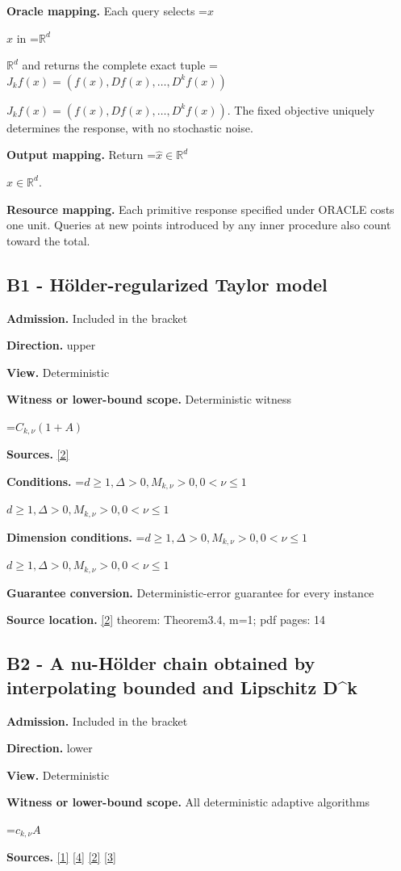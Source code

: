 \documentclass[10pt,a4paper]{article}
\newcommand{\AtlasMath}[1]{\par\begingroup\centering\setbox0=\hbox{$\displaystyle #1$}\ifdim\wd0>1.4\linewidth\typeout{ATLAS WIDE FORMULA: \the\wd0}\fi\ifdim\wd0>\linewidth\resizebox{\linewidth}{!}{\box0}\else\box0\fi\par\endgroup}
\newcommand{\AtlasInlineMath}[1]{\begingroup\setbox0=\hbox{$#1$}\ifdim\wd0>.4\linewidth\endgroup\AtlasMath{#1}\else\endgroup$#1$\fi}
\begin{document}
\textbf{Oracle mapping.} Each query selects \AtlasInlineMath{x} in \AtlasInlineMath{\mathbb{R}^d} and returns the complete exact tuple \AtlasInlineMath{J_{k}f(x)=(f(x),Df(x),\ldots,D^{k}f(x))}. The fixed objective uniquely determines the response, with no stochastic noise.

\textbf{Output mapping.} Return \AtlasInlineMath{\widehat{x}\in \mathbb{R}^d}.

\textbf{Resource mapping.} Each primitive response specified under ORACLE costs one unit. Queries at new points introduced by any inner procedure also count toward the total.

\subsection{B1 - Hölder-regularized Taylor model}
\textbf{Admission.} Included in the bracket

\textbf{Direction.} upper

\textbf{View.} Deterministic

\textbf{Witness or lower-bound scope.} Deterministic witness

\AtlasMath{C_{k,\nu}(1+A)}
\textbf{Sources.} \href{https://arxiv.org/abs/1811.01220}{[2]}

\textbf{Conditions.} \AtlasInlineMath{d\ge 1,\Delta>0,M_{k,\nu}>0,0<\nu\le 1}

\textbf{Dimension conditions.} \AtlasInlineMath{d\ge 1,\Delta>0,M_{k,\nu}>0,0<\nu\le 1}

\textbf{Guarantee conversion.} Deterministic-error guarantee for every instance

\textbf{Source location.} \href{https://arxiv.org/abs/1811.01220}{[2]} theorem: Theorem3.4, m=1; pdf pages: 14

\subsection{B2 - A nu-Hölder chain obtained by interpolating bounded and Lipschitz D\textasciicircum{}k}
\textbf{Admission.} Included in the bracket

\textbf{Direction.} lower

\textbf{View.} Deterministic

\textbf{Witness or lower-bound scope.} All deterministic adaptive algorithms

\AtlasMath{c_{k,\nu} A}
\textbf{Sources.} \href{https://arxiv.org/abs/1710.11606}{[1]} \href{https://arxiv.org/abs/1710.11606v3}{[4]} \href{https://arxiv.org/abs/1811.01220}{[2]} \href{https://arxiv.org/abs/2610.16295}{[3]}
\end{document}
